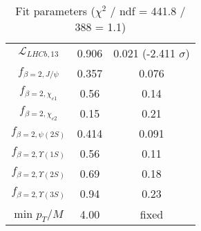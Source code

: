 \begin{table}[h!]
\begin{tabular}{c|c|c}
$\mathcal L_{LHCb,13}$ & 0.906 & 0.021 (-2.411 $\sigma$) \\
$f_{\beta=2,J/\psi}$ & 0.357 & 0.076 \\
$f_{\beta=2,\chi_{c1}}$ & 0.56 & 0.14 \\
$f_{\beta=2,\chi_{c2}}$ & 0.15 & 0.21 \\
$f_{\beta=2,\psi(2S)}$ & 0.414 & 0.091 \\
$f_{\beta=2,\Upsilon(1S)}$ & 0.56 & 0.11 \\
$f_{\beta=2,\Upsilon(2S)}$ & 0.69 & 0.18 \\
$f_{\beta=2,\Upsilon(3S)}$ & 0.94 & 0.23 \\
min $p_T/M$ & 4.00 & fixed \\
\end{tabular}
\caption{Fit parameters ($\chi^2$ / ndf = 441.8 / 388 = 1.1)}
\end{table}
